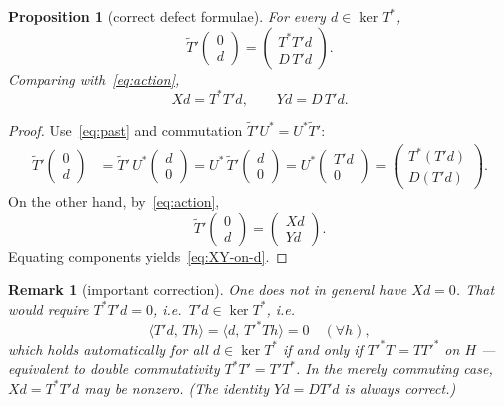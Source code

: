 \documentclass[11pt]{article}
\newtheorem{proposition}{Proposition}
\newtheorem{remark}{Remark}
\begin{document}
\begin{proposition}[correct defect formulae]
For every \(d\in\ker T^*\),
\begin{equation}
\label{eq:XY-d}
\boxed{
\widetilde{T}'\begin{pmatrix}0\\ d\end{pmatrix}
=
\begin{pmatrix}
T^*T'd\\
D\,T'd
\end{pmatrix}.
}
\end{equation}
Comparing with~\eqref{eq:action},
\begin{equation}
\label{eq:XY-on-d}
\boxed{Xd=T^*T'd,\qquad Yd=D\,T'd.}
\end{equation}
\end{proposition}

\begin{proof}
Use~\eqref{eq:past} and commutation \(\widetilde{T}'U^*=U^*\widetilde{T}'\):
\begin{align*}
\widetilde{T}'\begin{pmatrix}0\\ d\end{pmatrix}
&=
\widetilde{T}'\,U^*\begin{pmatrix}d\\ 0\end{pmatrix}
=
U^*\,\widetilde{T}'\begin{pmatrix}d\\ 0\end{pmatrix}
=
U^*\begin{pmatrix}T'd\\ 0\end{pmatrix}
=
\begin{pmatrix}T^*(T'd)\\ D(T'd)\end{pmatrix}.
\end{align*}
On the other hand, by~\eqref{eq:action},
\[
\widetilde{T}'\begin{pmatrix}0\\ d\end{pmatrix}
=
\begin{pmatrix}Xd\\ Yd\end{pmatrix}.
\]
Equating components yields~\eqref{eq:XY-on-d}.
\end{proof}

\begin{remark}[important correction]
One does \emph{not} in general have \(Xd=0\). That would require \(T^*T'd=0\), i.e.\
\(T'd\in\ker T^*\), i.e.\
\[
\langle T'd,\,Th\rangle=\langle d,\,{T'}^*Th\rangle=0\quad(\forall h),
\]
which holds automatically for all \(d\in\ker T^*\) if and only if
\({T'}^*T=T{T'}^*\) on \(H\) --- equivalent to double commutativity
\(T^*T'=T'T^*\). In the merely commuting case, \(Xd=T^*T'd\) may be nonzero.
(The identity \(Yd=DT'd\) is always correct.)
\end{remark}
\end{document}
